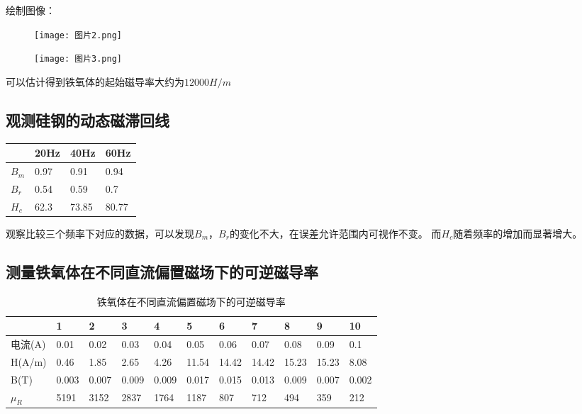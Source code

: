 \documentclass[12pt,a4paper]{article}
\begin{document}
绘制图像：
\begin{figure}[H]
    \centering
    \texttt{[image: 图片2.png]}
\end{figure}
\begin{figure}[H]
    \centering
    \texttt{[image: 图片3.png]}
\end{figure}

可以估计得到铁氧体的起始磁导率大约为$12000H/m$

\subsection{观测硅钢的动态磁滞回线}
\begin{table}[H]
    \centering
    \begin{tabular}{|l|l|l|l|}
    \hline
        ~ & 20Hz & 40Hz & 60Hz \\ \hline
        $B_m$ & 0.97  & 0.91  & 0.94  \\ \hline
        $B_r$ & 0.54 & 0.59  & 0.7  \\ \hline
        $H_c$ & 62.3 & 73.85  & 80.77 \\ \hline
    \end{tabular}
\end{table}
观察比较三个频率下对应的数据，可以发现$B_m$，$B_r$的变化不大，在误差允许范围内可视作不变。
而$H_c$随着频率的增加而显著增大。

\subsection{测量铁氧体在不同直流偏置磁场下的可逆磁导率}
\begin{table}[H]
    \centering
    \caption{铁氧体在不同直流偏置磁场下的可逆磁导率}
    \begin{tabular}{|l|l|l|l|l|l|l|l|l|l|l|}
    \hline
        ~ & 1 & 2 & 3 & 4 & 5 & 6 & 7 & 8 & 9 & 10 \\ \hline
        电流(A) & 0.01 & 0.02 & 0.03 & 0.04 & 0.05 & 0.06 & 0.07 & 0.08 & 0.09 & 0.1 \\ \hline
        H(A/m) & 0.46  & 1.85  & 2.65  & 4.26  & 11.54  & 14.42  & 14.42  & 15.23  & 15.23  & 8.08  \\ \hline
        B(T) & 0.003  & 0.007  & 0.009  &0.009& 0.017& 0.015  & 0.013  & 0.009  & 0.007  & 0.002   \\ \hline
        $\mu_R$ & 5191  & 3152  & 2837  & 1764  & 1187  & 807  & 712 & 494  & 359  & 212 \\ \hline
    \end{tabular}
\end{table}
\end{document}
